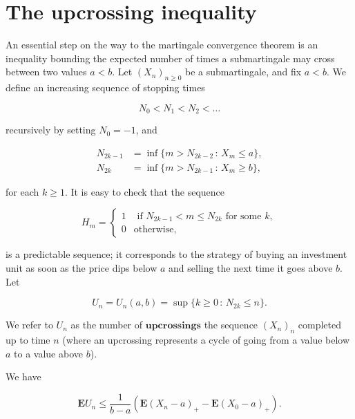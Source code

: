 \section{The upcrossing inequality}
An essential step on the way to the martingale
convergence theorem is an inequality bounding the
expected number of times a submartingale may cross
between two values $a<b$. Let $(X_n)_{n\ge 0}$ be a
submartingale, and fix $a<b$. We define an increasing
sequence of stopping times

\[
N_0 < N_1 < N_2 < \ldots
\]

\noindent recursively by setting $N_0=-1$, and

\begin{align*}
N_{2k-1} &= \inf \{ m > N_{2k-2}\,:\,X_m\le a\}, \\
N_{2k} &= \inf \{ m > N_{2k-1}\,:\,X_m\ge b\},
\end{align*}

\noindent for each $k\ge 1$. It is easy to check that the
sequence

\[
H_m = \begin{cases} 1 &\textrm{ if }N_{2k-1}<m\le N_{2k}\textrm{ for some }k, \\
0 & \textrm{otherwise},
\end{cases}
\]

\noindent is a predictable sequence; it corresponds to the
strategy of buying an investment unit as soon as the
price dips below $a$ and selling the next time it
goes above $b$. Let

\[
U_n = U_n(a,b) = \sup \{ k\ge 0\,:\,N_{2k}\le n\}.
\]

\noindent We refer to $U_n$ as the number of
$\textbf{upcrossings}$ the sequence $(X_n)_n$
completed up to time $n$ (where an upcrossing
represents a cycle of going from a value below $a$ to
a value above $b$).

\begin{thm}
We have

\[
\mathbf{E} U_n \le \frac{1}{b-a}\left( \mathbf{E}(X_n-a)_+ - \mathbf{E}(X_0-a)_+ \right).
\]

\end{thm}


